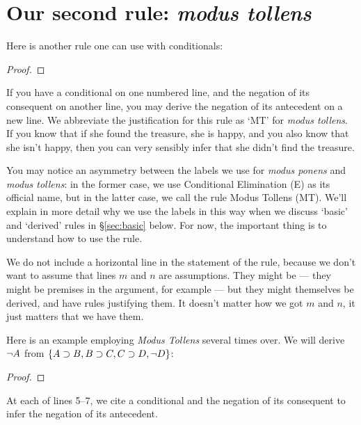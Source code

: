 \section{Our second rule: \emph{modus tollens}}

Here is another rule one can use with conditionals:

\begin{proof}
	 
\end{proof}

If you have a conditional on one numbered line, and the negation of its consequent on another line, you may derive the negation of its antecedent on a new line. We abbreviate the justification for this rule as `MT' for \emph{modus tollens}. If you know that if she found the treasure, she is happy, and you also know that she isn't happy, then you can very sensibly infer that she didn't find the treasure.

You may notice an asymmetry between the labels we use for \emph{modus ponens} and \emph{modus tollens}: in the former case, we use Conditional Elimination (\eif E) as its official name, but in the latter case, we call the rule Modus Tollens (MT). We'll explain in more detail why we use the labels in this way when we discuss `basic' and `derived' rules in \S\ref{sec:basic} below. For now, the important thing is to understand how to use the rule.

We do not include a horizontal line in the statement of the rule, because we don't want to assume that lines $m$ and $n$ are assumptions. They might be --- they might be premises in the argument, for example --- but they might themselves be derived, and have rules justifying them. It doesn't matter how we got $m$ and $n$, it just matters that we have them.

Here is an example employing \emph{Modus Tollens} several times over. We will derive $\neg A$ from $\{A \supset B, B \supset C, C \supset D, \neg D\}$:

\begin{proof}
	 
	 
	 
	 
\end{proof}

At each of lines 5--7, we cite a conditional and the negation of its consequent to infer the negation of its antecedent.


